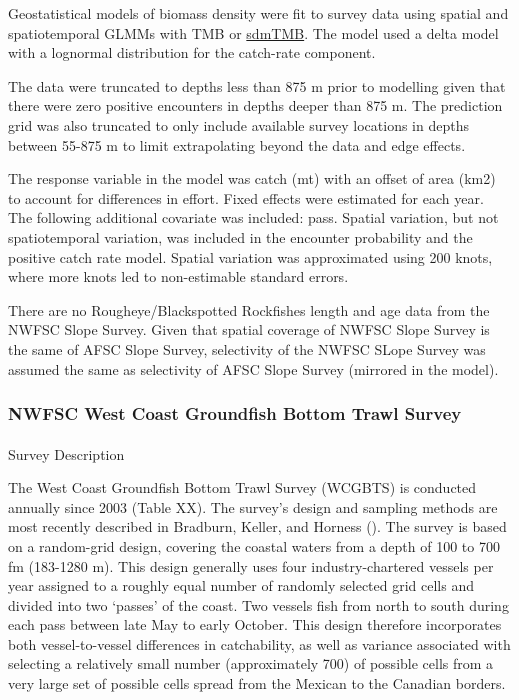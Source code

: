 \documentclass[
]{scrartcl}
\makeatletter
\let\oldparagraph\paragraph
\renewcommand{\paragraph}{
    \@ifstar
      \xxxParagraphStar
      \xxxParagraphNoStar
  }
\newcommand{\xxxParagraphStar}[1]{\oldparagraph*{#1}\mbox{}}
\newcommand{\xxxParagraphNoStar}[1]{\oldparagraph{#1}\mbox{}}
\makeatother
\begin{document}
Geostatistical models of biomass density were fit to survey data using
spatial and spatiotemporal GLMMs with TMB or
\href{https://pbs-assess.github.io/sdmTMB/}{sdmTMB}. The model used a
delta model with a lognormal distribution for the catch-rate component.

The data were truncated to depths less than 875 m prior to modelling
given that there were zero positive encounters in depths deeper than 875
m. The prediction grid was also truncated to only include available
survey locations in depths between 55-875 m to limit extrapolating
beyond the data and edge effects.

The response variable in the model was catch (mt) with an offset of area
(km2) to account for differences in effort. Fixed effects were estimated
for each year. The following additional covariate was included: pass.
Spatial variation, but not spatiotemporal variation, was included in the
encounter probability and the positive catch rate model. Spatial
variation was approximated using 200 knots, where more knots led to
non-estimable standard errors.

There are no Rougheye/Blackspotted Rockfishes length and age data from
the NWFSC Slope Survey. Given that spatial coverage of NWFSC Slope
Survey is the same of AFSC Slope Survey, selectivity of the NWFSC SLope
Survey was assumed the same as selectivity of AFSC Slope Survey
(mirrored in the model).

\subsubsection{NWFSC West Coast Groundfish Bottom Trawl
Survey}\label{nwfsc-west-coast-groundfish-bottom-trawl-survey}

\paragraph{Survey Description}\label{survey-description-3}

The West Coast Groundfish Bottom Trawl Survey (WCGBTS) is conducted
annually since 2003 (Table XX). The survey's design and sampling methods
are most recently described in Bradburn, Keller, and Horness
(). The survey is based on a
random-grid design, covering the coastal waters from a depth of 100 to
700 fm (183-1280 m). This design generally uses four industry-chartered
vessels per year assigned to a roughly equal number of randomly selected
grid cells and divided into two `passes' of the coast. Two vessels fish
from north to south during each pass between late May to early October.
This design therefore incorporates both vessel-to-vessel differences in
catchability, as well as variance associated with selecting a relatively
small number (approximately 700) of possible cells from a very large set
of possible cells spread from the Mexican to the Canadian borders.
\end{document}
